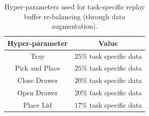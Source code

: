 \documentclass[letterpaper, 10 pt, conference]{ieeeconf}  %
\begin{document}
\begin{table}[h!]
    \centering
    \begin{tabular}{c|c}
    \hline
    \textbf{Hyper-parameter} & \textbf{Value} \\
    \hline
    Tray & $25 \%$ task specific data\\
    Pick and Place & $25 \%$ task specific data\\
    Close Drawer & $20 \%$ task specific data\\
    Open Drawer & $20 \%$ task specific data\\
    Place Lid & $17 \%$ task specific data\\
    \hline
    \end{tabular}
\caption{Hyper-parameters used for task-specific replay buffer re-balancing (through data augmentation).}
\label{table:task-data-hyperparams}
\end{table}
\end{document}
